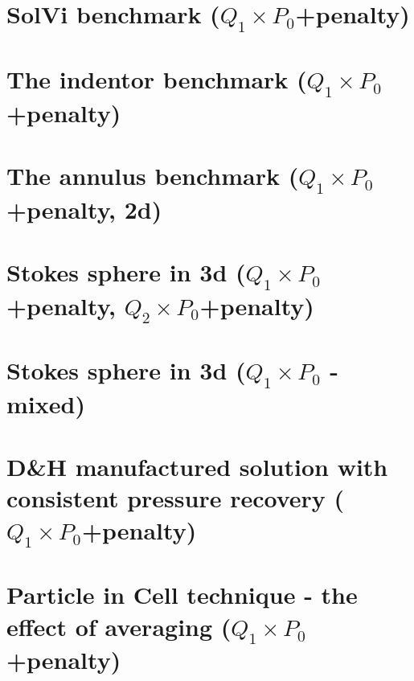 \documentclass[a4paper,11pt]{report}
\begin{document}
\chapter{SolVi benchmark ($Q_1\times P_0$+penalty) \label{f07}} %

\chapter{The indentor benchmark ($Q_1\times P_0$+penalty)\label{f08}} %
 
\chapter{The annulus benchmark ($Q_1\times P_0$+penalty, 2d) \label{f09}} %

\chapter{Stokes sphere in 3d ($Q_1 \times P_0$+penalty, $Q_2 \times P_0$+penalty)\label{f10}} %

\chapter{Stokes sphere in 3d ($Q_1\times P_0$ - mixed) \label{f11}} %

\chapter{D\&H manufactured solution with consistent pressure recovery ($Q_1\times P_0$+penalty)\label{f12}} %

\chapter{Particle in Cell technique - the effect of averaging ($Q_1\times P_0$+penalty)\label{f13}} %
\end{document}
